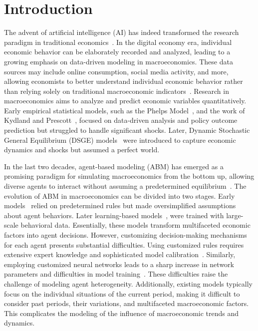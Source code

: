 \section{Introduction}
\label{sec::intro}
The advent of artificial intelligence (AI) has indeed transformed the research paradigm in traditional economics~\cite{jorgenson2001information}. In the digital economy era, individual economic behavior can be elaborately recorded and analyzed, leading to a growing emphasis on data-driven modeling in macroeconomics. These data sources may include online consumption, social media activity, and more, allowing economists to better understand individual economic behavior rather than relying solely on traditional macroeconomic indicators~\cite{schorfheide2015real}.
Research in macroeconomics aims to analyze and predict economic variables quantitatively. Early empirical statistical models, such as the Phelps Model~\cite{phelps1967phillips}, and the work of Kydland and Prescott~\cite{kydland1982time}, focused on data-driven analysis and policy outcome prediction but struggled to handle significant shocks. Later, Dynamic Stochastic General Equilibrium (DSGE) models~\cite{christiano2005nominal} were introduced to capture economic dynamics and shocks but assumed a perfect world.

In the last two decades, agent-based modeling (ABM) has emerged as a promising paradigm for simulating macroeconomics from the bottom up, allowing diverse agents to interact without assuming a predetermined equilibrium~\cite{farmer2009economy}. The evolution of ABM in macroeconomics can be divided into two stages. Early models~\cite{tesfatsion2006handbook,brock1998heterogeneous} relied on predetermined rules but made oversimplified assumptions about agent behaviors. Later learning-based models~\cite{trott2021building,zheng2022ai,mi2023taxai}, were trained with large-scale behavioral data. Essentially, these models transform multifaceted economic factors into agent decisions.
However, customizing decision-making mechanisms for each agent presents substantial difficulties. Using customized rules requires extensive expert knowledge and sophisticated model calibration~\cite{windrum2007empirical}. Similarly, employing customized neural networks leads to a sharp increase in network parameters and difficulties in model training~\cite{mi2023taxai}. These difficulties raise the challenge of modeling agent heterogeneity. Additionally, existing models typically focus on the individual situations of the current period, making it difficult to consider past periods, their variations, and multifaceted macroeconomic factors. This complicates the modeling of the influence of macroeconomic trends and dynamics.

